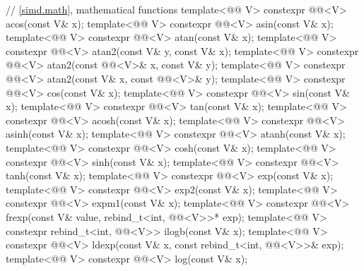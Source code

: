 \begin{codeblock}
{  // \ref{simd.math}, mathematical functions
  template<@@ V> constexpr @@<V> acos(const V& x);
  template<@@ V> constexpr @@<V> asin(const V& x);
  template<@@ V> constexpr @@<V> atan(const V& x);
  template<@@ V>
    constexpr @@<V> atan2(const V& y, const V& x);
  template<@@ V>
    constexpr @@<V> atan2(const @@<V>& x, const V& y);
  template<@@ V>
    constexpr @@<V> atan2(const V& x, const @@<V>& y);
  template<@@ V> constexpr @@<V> cos(const V& x);
  template<@@ V> constexpr @@<V> sin(const V& x);
  template<@@ V> constexpr @@<V> tan(const V& x);
  template<@@ V> constexpr @@<V> acosh(const V& x);
  template<@@ V> constexpr @@<V> asinh(const V& x);
  template<@@ V> constexpr @@<V> atanh(const V& x);
  template<@@ V> constexpr @@<V> cosh(const V& x);
  template<@@ V> constexpr @@<V> sinh(const V& x);
  template<@@ V> constexpr @@<V> tanh(const V& x);
  template<@@ V> constexpr @@<V> exp(const V& x);
  template<@@ V> constexpr @@<V> exp2(const V& x);
  template<@@ V> constexpr @@<V> expm1(const V& x);
  template<@@ V>
    constexpr @@<V>
      frexp(const V& value, rebind_t<int, @@<V>>* exp);
  template<@@ V>
    constexpr rebind_t<int, @@<V>> ilogb(const V& x);
  template<@@ V>
    constexpr @@<V> ldexp(const V& x, const rebind_t<int, @@<V>>& exp);
  template<@@ V> constexpr @@<V> log(const V& x);
}
\end{codeblock}
